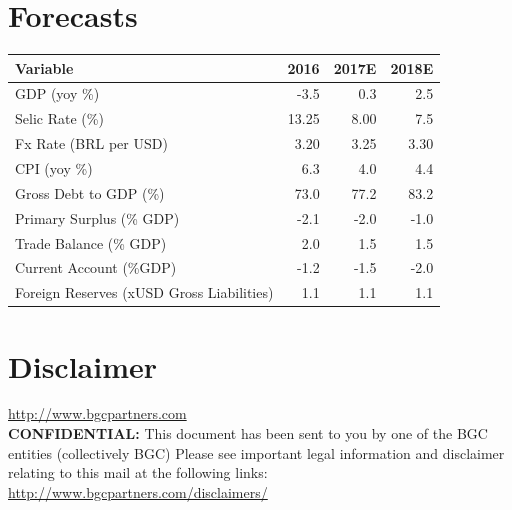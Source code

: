 \documentclass{report}
\begin{document}
\newpage



\section{Forecasts}
\label{sec:orgefb4c8b}


\begin{center}
\begin{tabular}{lrrr}
\hline
\textbf{Variable} & \textbf{2016} & \textbf{2017E} & \textbf{2018E}\\
\hline
\hline
GDP (yoy \%) & -3.5 & 0.3 & 2.5\\
Selic Rate (\%) & 13.25 & 8.00 & 7.5\\
Fx Rate (BRL per USD) & 3.20 & 3.25 & 3.30\\
CPI (yoy \%) & 6.3 & 4.0 & 4.4\\
Gross Debt to GDP (\%) & 73.0 & 77.2 & 83.2\\
Primary Surplus (\% GDP) & -2.1 & -2.0 & -1.0\\
Trade Balance (\% GDP) & 2.0 & 1.5 & 1.5\\
Current Account (\%GDP) & -1.2 & -1.5 & -2.0\\
Foreign Reserves (xUSD Gross Liabilities) & 1.1 & 1.1 & 1.1\\
\hline
\end{tabular}
\end{center}

\newpage


\section{Disclaimer}
\label{sec:orgee1fc64}
\url{http://www.bgcpartners.com} \\
\textbf{CONFIDENTIAL:} This document has been sent to you by one of
the BGC entities (collectively BGC) Please see important legal
information and disclaimer relating to this mail at the following
links: \url{http://www.bgcpartners.com/disclaimers/}
\end{document}
